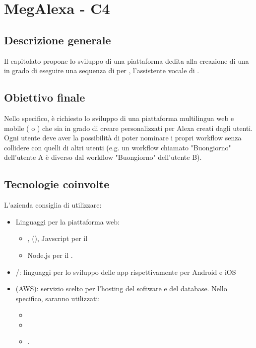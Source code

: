 \section{MegAlexa - C4} \label{c4}

    \subsection{Descrizione generale}
    Il capitolato propone lo sviluppo di una piattaforma
    dedita alla creazione di una  in grado di eseguire una sequenza
    di  per , l'assistente vocale di .

    \subsection{Obiettivo finale}
    Nello specifico, \`e richiesto lo sviluppo di una piattaforma multilingua web e
    mobile ( o ) che sia in grado di
    creare  personalizzati per Alexa creati dagli utenti. Ogni utente
    deve aver la possibilit\`a di poter nominare i propri workflow senza collidere con
    quelli di altri utenti (e.g. un workflow chiamato "Buongiorno" dell'utente A \`e
    diverso dal workflow "Buongiorno" dell'utente B).

    \subsection{Tecnologie coinvolte}
    L'azienda consiglia di utilizzare:
    \begin{itemize}
    	\item Linguaggi per la piattaforma web:
    	\begin{itemize}
            \item {},  (), Javscript
                per il 
            \item Node.js per il .
    	\end{itemize}
        \item {}/: linguaggi per lo sviluppo delle app
            rispettivamente per Android e iOS
        \item {} (AWS): servizio scelto per l'hosting del software e del database.
            Nello specifico, saranno utilizzati:
            \begin{itemize}
                \item {}
                \item {}
                \item {}.
            \end{itemize}
    \end{itemize}

